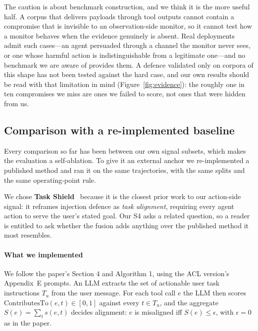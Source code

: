 \documentclass[preprint,12pt,authoryear]{elsarticle}
\theoremstyle{definition}
\begin{document}
The caution is about benchmark construction, and we think it is the more useful
half. A corpus that delivers payloads through tool outputs cannot contain a
compromise that is invisible to an observation-side monitor, so it cannot test how
a monitor behaves when the evidence genuinely is absent. Real deployments admit
such cases---an agent persuaded through a channel the monitor never sees, or one
whose harmful action is indistinguishable from a legitimate one---and no benchmark
we are aware of provides them. A defence validated only on corpora of this shape
has not been tested against the hard case, and our own results should be read with
that limitation in mind (Figure~\ref{fig:evidence}): the roughly one in ten
compromises we miss are ones we failed to score, not ones that were hidden from
us.

\subsection{Comparison with a re-implemented baseline}\label{sec:baseline}

Every comparison so far has been between our own signal subsets, which makes the
evaluation a self-ablation. To give it an external anchor we re-implemented a
published method and ran it on the same trajectories, with the same splits and the
same operating-point rule.

We chose \textbf{Task Shield}~\citep{jia2024taskshield} because it is the closest
prior work to our action-side signal: it reframes injection defence as
\emph{task alignment}, requiring every agent action to serve the user's stated
goal. Our S4 asks a related question, so a reader is entitled to ask whether the
fusion adds anything over the published method it most resembles.

\paragraph{What we implemented} We follow the paper's Section 4 and Algorithm 1,
using the ACL version's Appendix~E prompts. An LLM extracts the set of actionable user task
instructions $T_u$ from the user message. For each tool call $e$ the LLM then
scores $\mathrm{ContributesTo}(e,t) \in [0,1]$ against every $t \in T_u$, and the
aggregate $S(e) = \sum_{t} s(e,t)$ decides alignment: $e$ is misaligned iff
$S(e) \le \epsilon$, with $\epsilon = 0$ as in the paper.
\end{document}
